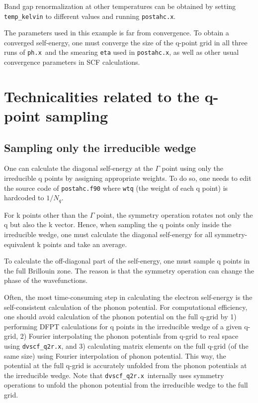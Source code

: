 \documentclass[12pt,a4paper]{article}
\def\phx{\texttt{ph.x}}
\def\postahcx{\texttt{postahc.x}}
\def\dvscfqtrx{\texttt{dvscf\_q2r.x}}
\begin{document}
Band gap renormalization at other temperatures can be obtained by setting
\texttt{temp\_kelvin} to different values and running \postahcx.

The parameters used in this example is far from convergence.
To obtain a converged self-energy, one must converge the size of the
q-point grid in all three runs of \phx\ and the smearing \texttt{eta}
used in \postahcx, as well as other usual convergence parameters
in SCF calculations.

\section{Technicalities related to the q-point sampling}

\subsection{Sampling only the irreducible wedge} \label{sec:sampling}
One can calculate the diagonal self-energy at the $\Gamma$ point
using only the irreducible q points by assigning appropriate weights.
To do so, one needs to edit the source code of \texttt{postahc.f90}
where \texttt{wtq} (the weight of each q point) is hardcoded to $1/N_q$.

For k points other than the $\Gamma$ point, the symmetry operation rotates
not only the q but also the k vector. Hence, when sampling the q points only
inside the irreducible wedge, one must calculate the diagonal self-energy
for all symmetry-equivalent k points and take an average.

To calculate the off-diagonal part of the self-energy, one must sample
q points in the full Brillouin zone.
The reason is that the symmetry operation can change the phase of the
wavefunctions.

Often, the most time-consuming step in calculating the electron self-energy
is the self-consistent calculation of the phonon potential.
For computational efficiency, one should avoid calculation of the phonon
potential on the full q-grid by
1) performing DFPT calculations for q points in the irreducible wedge
of a given q-grid,
2) Fourier interpolating the phonon potentials from q-grid to real space
using \dvscfqtrx,
and 3) calculating matrix elements on the full q-grid (of the same size)
using Fourier interpolation of phonon potential.
This way, the potential at the full q-grid is accurately unfolded from the
phonon potentials at the irreducible wedge.
Note that \dvscfqtrx\ internally uses symmetry operations to unfold the
phonon potential from the irreducible wedge to the full grid.
\end{document}
